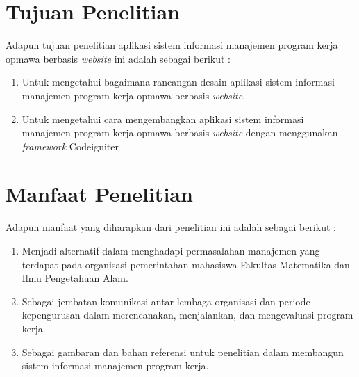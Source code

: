 \section{Tujuan Penelitian}
Adapun tujuan penelitian aplikasi sistem informasi manajemen program kerja opmawa berbasis \emph{website} ini adalah sebagai berikut : 
\begin{enumerate}
	\item Untuk mengetahui bagaimana rancangan desain aplikasi sistem informasi manajemen program kerja opmawa berbasis \emph{website}.
	\item Untuk mengetahui cara mengembangkan aplikasi sistem informasi manajemen program kerja opmawa berbasis \emph{website} dengan menggunakan \emph{framework} Codeigniter
\end{enumerate}

\section{Manfaat Penelitian}
Adapun manfaat yang diharapkan dari penelitian ini adalah sebagai berikut :
	\begin{enumerate}
		\item Menjadi alternatif dalam menghadapi permasalahan manajemen yang terdapat pada organisasi pemerintahan mahasiswa Fakultas Matematika dan Ilmu Pengetahuan Alam.
		\item Sebagai jembatan komunikasi antar lembaga organisasi dan periode kepengurusan dalam merencanakan, menjalankan, dan mengevaluasi program kerja.
		\item Sebagai gambaran dan bahan referensi untuk penelitian dalam membangun sistem informasi manajemen program kerja.   	
	\end{enumerate}
		
\begin{comment}

\end{comment}
